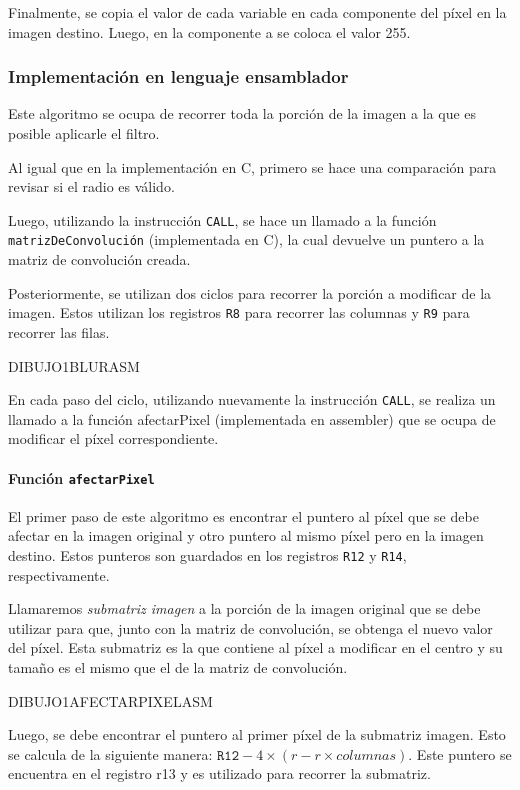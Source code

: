         Finalmente, se copia el valor de cada variable en cada componente del píxel en la imagen destino. Luego, en la componente \textsf{a} se coloca el valor 255.  

    \subsubsection{Implementación en lenguaje ensamblador} 
      Este algoritmo se ocupa de recorrer toda la porción de la imagen a la que es posible aplicarle el filtro. 
      
      Al igual que en la implementación en C, primero se hace una comparación para revisar si el radio es válido. 
      
      Luego, utilizando la instrucción \texttt{CALL}, se hace un llamado a la función \texttt{matrizDeConvolución} (implementada en C), la cual devuelve un puntero a la matriz de convolución creada. 
      
      Posteriormente, se utilizan dos ciclos para recorrer la porción a modificar de la imagen. Estos utilizan los registros \texttt{R8} para recorrer las columnas y \texttt{R9} para recorrer las filas.
  
      DIBUJO1BLURASM
      
      En cada paso del ciclo, utilizando nuevamente la instrucción \texttt{CALL}, se realiza un llamado a la función afectarPixel (implementada en assembler) que se ocupa de modificar el píxel correspondiente. 

      \paragraph{Función \texttt{afectarPixel}}
        El primer paso de este algoritmo es encontrar el puntero al píxel que se debe afectar en la imagen original y otro puntero al mismo píxel pero en la imagen destino. Estos punteros son guardados en los registros \texttt{R12} y \texttt{R14}, respectivamente.   

        Llamaremos \emph{submatriz imagen} a la porción de la imagen original que se debe utilizar para que, junto con la matriz de convolución, se obtenga el nuevo valor del píxel. Esta submatriz es la que contiene al píxel a modificar en el centro y su tamaño es el mismo que el de la matriz de convolución. 
        
        DIBUJO1AFECTARPIXELASM

        Luego, se debe encontrar el puntero al primer píxel de la submatriz imagen. Esto se calcula de la siguiente manera: $\mathtt{R12} - 4 \times (r - r \times columnas)$. Este puntero se encuentra en el registro r13 y es utilizado para recorrer la submatriz. 

